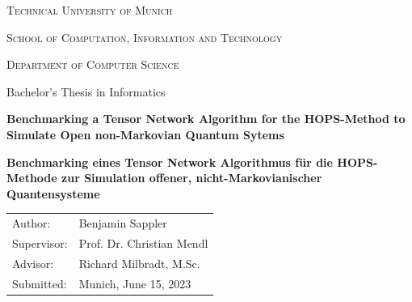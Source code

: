 \documentclass[%
thesis=student,%
coverpage=false,%
titlepage=false,%
headmarks=true, %
twoside=false,
english,%
font=libertine, %
math=newpxtx, %
BCOR=5mm,%
coverBCOR=11mm,%
]{tumbook}
\begin{document}
\begin{center}
    \thispagestyle{empty}
    \theTUMLogo[height=2.5cm, color=TUMBlue]
    \vspace*{0.5cm}
    \par\textsc{\Huge Technical University of Munich}
    \vspace*{0.5cm}
    \par\textsc{\Large School of Computation, Information and Technology}
    \vspace*{0.3cm}
    \par\textsc{\Large Department of Computer Science}
    \vspace*{2cm}
    \par\Large Bachelor's Thesis in Informatics
    \vspace*{1.5cm}
    \par\textbf{\Huge Benchmarking a Tensor Network Algorithm for the HOPS-Method to Simulate Open non-Markovian Quantum Sytems}
    \vspace*{1.5cm}
    \par\textbf{\Huge Benchmarking eines Tensor Network Algorithmus für die HOPS-Methode zur Simulation offener, nicht-Markovianischer Quantensysteme}
    \vspace*{2cm}
    \par
    \begin{tabular}{l l}
        Author: & Benjamin Sappler\\
        Supervisor: & Prof. Dr. Christian Mendl\\
        Advisor: & Richard Milbradt, M.Sc.\\
        Submitted: & Munich, June 15, 2023\\
    \end{tabular}
\end{center}

\newpage

\thispagestyle{empty}
\null\vfill
\@tum@student@disclamer@block@
\end{document}
